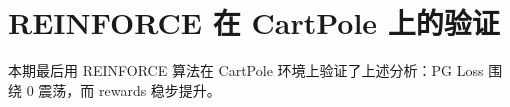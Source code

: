 \section{REINFORCE 在 CartPole 上的验证}
本期最后用 REINFORCE 算法在 CartPole 环境上验证了上述分析：PG Loss 围绕 0 震荡，而 rewards 稳步提升。

\newpage
